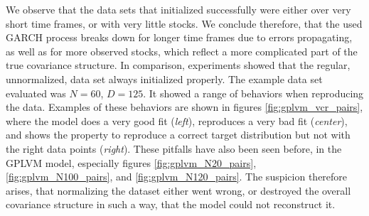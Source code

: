 We observe that the data sets that initialized successfully were either over very short time frames, or with very little stocks. We conclude therefore, that the used GARCH process breaks down for longer time frames due to errors propagating, as well as for more observed stocks, which reflect a more complicated part of the true covariance structure. In comparison, experiments showed that the regular, unnormalized, data set always initialized properly. \newline \newline
The example data set evaluated was $N=60$, $D=125$. It showed a range of behaviors when reproducing the data. Examples of these behaviors are shown in figures \ref{fig:gplvm_vcr_pairs}, where the model does a very good fit (\textit{left}), reproduces a very bad fit (\textit{center}), and shows the property to reproduce a correct target distribution but not with the right data points (\textit{right}). These pitfalls have also been seen before, in the GPLVM model, especially figures \ref{fig:gplvm_N20_pairs}, \ref{fig:gplvm_N100_pairs}, and \ref{fig:gplvm_N120_pairs}. The suspicion therefore arises, that normalizing the dataset either went wrong, or destroyed the overall covariance structure in such a way, that the model could not reconstruct it. 
